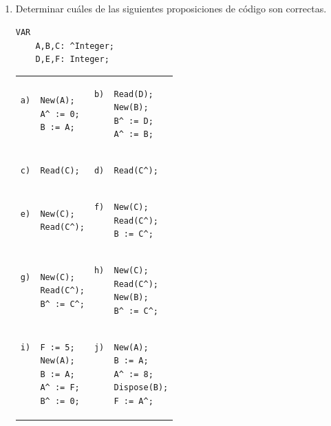 \documentclass[a4paper,10pt]{article}
\begin{document}
~\\ \\ \\ \\

\begin{enumerate}

\item Determinar cu\'ales de las siguientes proposiciones de c\'odigo son correctas.
\begin{small}
\begin{verbatim}
VAR
    A,B,C: ^Integer;
    D,E,F: Integer;
\end{verbatim}
\begin{tabular}{ p{} p{} }
\begin{verbatim}
a)  New(A);
    A^ := 0;
    B := A;
\end{verbatim}
  &
\begin{verbatim}
b)  Read(D);
    New(B);
    B^ := D;
    A^ := B;
\end{verbatim} 
\\
\begin{verbatim}
c)  Read(C);
\end{verbatim}
  &
\begin{verbatim}
d)  Read(C^);
\end{verbatim}
\\
\begin{verbatim}
e)  New(C);
    Read(C^);
\end{verbatim}
  &
\begin{verbatim}
f)  New(C);
    Read(C^);
    B := C^;
\end{verbatim}
\\
\begin{verbatim}
g)  New(C);
    Read(C^);
    B^ := C^;
\end{verbatim}
  &
\begin{verbatim}
h)  New(C);
    Read(C^);
    New(B);
    B^ := C^;
\end{verbatim}
\\
\begin{verbatim}
i)  F := 5;
    New(A);
    B := A;
    A^ := F;
    B^ := 0;
\end{verbatim}
    &
\begin{verbatim}
j)  New(A);
    B := A;
    A^ := 8;
    Dispose(B);
    F := A^;
\end{verbatim}
\end{tabular}
\end{small}


\end{enumerate}
\end{document}
